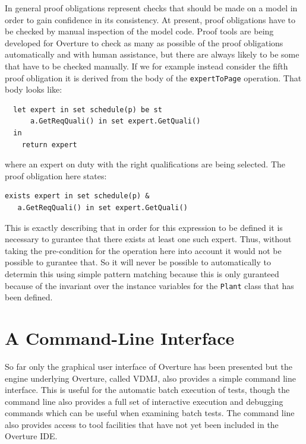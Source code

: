 In general proof obligations represent checks that should be made on a
model in order to gain confidence in its consistency. At present,
proof obligations have to be checked by manual inspection of the model
code. Proof tools are being developed for Overture to check as many as
possible of the proof obligations automatically and with human
assistance, but there are always likely to be some that have to be
checked manually. If we for example instead consider the fifth proof
obligation it is derived from the body of the \texttt{expertToPage}
operation. That body looks like:

\begin{lstlisting}
  let expert in set schedule(p) be st
      a.GetReqQuali() in set expert.GetQuali()
  in
    return expert
\end{lstlisting}

\noindent where an expert on duty with the right qualifications are
being selected. The proof obligation here states:

\begin{lstlisting}
exists expert in set schedule(p) & 
   a.GetReqQuali() in set expert.GetQuali()
\end{lstlisting}

\noindent This is exactly describing that in order for this expression
to be defined it is necessary to gurantee that there exists at least
one such expert. Thus, without taking the pre-condition for the
operation here into account it would not be possible to gurantee
that. So it will never be possible to automatically to determin this
using simple pattern matching because this is only guranteed because
of the invariant over the instance variables for the \texttt{Plant}
class that has been defined.
 
\section{A Command-Line Interface}\label{sec:cmdline}

So far only the graphical user interface of Overture has been
presented but the engine underlying Overture, called VDMJ, also
provides a simple command line interface.  This is useful for the
automatic batch execution of tests, though the command line also
provides a full set of interactive execution and debugging commands
which can be useful when examining batch tests. The command line also
provides access to tool facilities that have not yet been included in
the Overture IDE.


